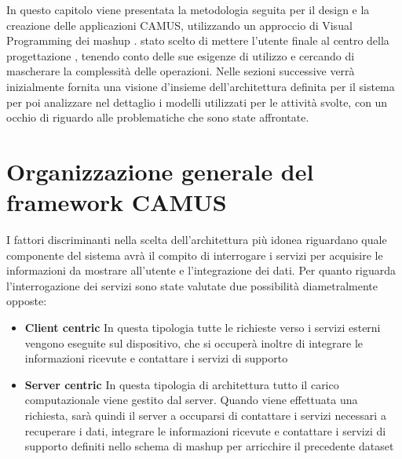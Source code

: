 In questo capitolo viene presentata la metodologia seguita per il design e la creazione delle applicazioni CAMUS, utilizzando un approccio di Visual Programming dei mashup \cite{DBLP:journals/tweb/CappielloMP15}. \upe stato scelto di mettere l'utente finale al centro della progettazione \cite{lieberman2006end}, tenendo conto delle sue esigenze di utilizzo e cercando di mascherare la complessità delle operazioni. %
Nelle sezioni successive verrà inizialmente fornita una visione d'insieme dell'architettura definita per il sistema per poi analizzare nel dettaglio i modelli utilizzati per le attività svolte, con un occhio di riguardo alle problematiche che sono state affrontate.

\section{Organizzazione generale del framework CAMUS\label{sec:architettura-sistema}}

I fattori discriminanti nella scelta dell'architettura più idonea riguardano quale componente del sistema avrà il compito di interrogare i servizi per acquisire le informazioni da mostrare all'utente e l'integrazione dei dati.
Per quanto riguarda l'interrogazione dei servizi sono state valutate due possibilità diametralmente opposte:

\begin{itemize}
	\item \textbf{Client centric} In questa tipologia tutte le richieste verso i servizi esterni vengono eseguite sul dispositivo, che si occuperà inoltre di integrare le informazioni ricevute e contattare i servizi di supporto
	\item \textbf{Server centric} In questa tipologia di architettura tutto il carico computazionale viene gestito dal server. Quando viene effettuata una richiesta, sarà quindi il server a occuparsi di contattare i servizi necessari a recuperare i dati, integrare le informazioni ricevute e contattare i servizi di supporto definiti nello schema di mashup per arricchire il precedente dataset
\end{itemize}

